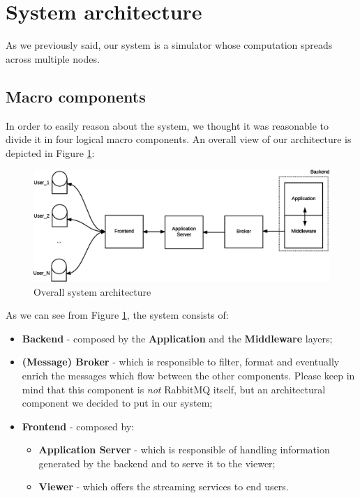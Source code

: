 \section{System architecture}
As we previously said, our system is a simulator whose computation spreads
across multiple nodes.

\subsection{Macro components}

In order to easily reason about the system, we thought it was reasonable to
divide it in four logical macro components.
An overall view of our architecture
is depicted in Figure \ref{fig:sd-sys-arch-overall}:

\begin{figure}[H]
  \centering
  \includegraphics[scale=0.5,keepaspectratio]
    {images/solution/overall-arch.eps}
  \caption{Overall system architecture}
  \label{fig:sd-sys-arch-overall}
\end{figure}

As we can see from Figure \ref{fig:sd-sys-arch-overall}, the system consists of:

\begin{itemize}
  \item \textbf{Backend} - composed by the \textbf{Application} and the
    \textbf{Middleware} layers;
  \item \textbf{(Message) Broker} - which is responsible to filter, format
    and eventually enrich the messages which flow between the other components.
    Please keep in mind that this component is \textit{not} RabbitMQ itself,
    but an architectural component we decided to put in our system;
  \item \textbf{Frontend} - composed by:
  \begin{itemize}
    \item \textbf{Application Server} - which is responsible of handling
      information generated by the backend and to serve it to the viewer;
    \item \textbf{Viewer} - which offers the streaming services to end users.
  \end{itemize}
\end{itemize}

